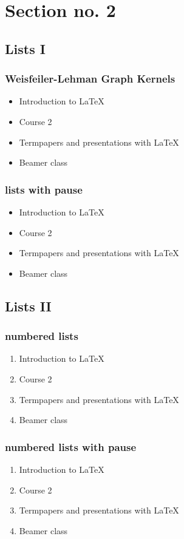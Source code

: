 \section{Section no. 2} 
\subsection{Lists I}
\begin{frame}\frametitle{Weisfeiler-Lehman Graph Kernels}
\begin{itemize}
\item Introduction to  \LaTeX  
\item Course 2 
\item Termpapers and presentations with \LaTeX 
\item Beamer class
\end{itemize} 
\end{frame}

\begin{frame}\frametitle{lists with pause}
\begin{itemize}
\item Introduction to  \LaTeX \pause 
\item Course 2 \pause 
\item Termpapers and presentations with \LaTeX \pause 
\item Beamer class
\end{itemize} 
\end{frame}

\subsection{Lists II}
\begin{frame}\frametitle{numbered lists}
\begin{enumerate}
\item Introduction to  \LaTeX  
\item Course 2 
\item Termpapers and presentations with \LaTeX 
\item Beamer class
\end{enumerate}
\end{frame}

\begin{frame}\frametitle{numbered lists with pause}
\begin{enumerate}
\item Introduction to  \LaTeX \pause 
\item Course 2 \pause 
\item Termpapers and presentations with \LaTeX \pause 
\item Beamer class
\end{enumerate}
\end{frame}

